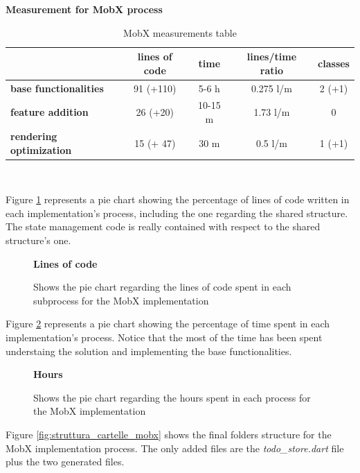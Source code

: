 \begin{table}[H]
    \caption*{\textbf{Measurement for MobX process}}
    \centering 
       \begin{tabular}{| l | c | c | c | c |}
    \hline
    \rowcolor{bluepoli!40} %
    \hline
     & \textbf{lines of code} & \textbf{time} & \textbf{lines/time ratio} & \textbf{classes} \T\B \\
     \hline
    \textbf{base functionalities} & 91 (+110) & 5-6 h & 0.275 l/m & 2 (+1) \T\B \\ 
    \textbf{feature addition} & 26 (+20) & 10-15 m & 1.73 l/m & 0 \T\B\\ 
    \textbf{rendering optimization} & 15 (+ 47) & 30 m & 0.5 l/m & 1 (+1) \B\\
    \hline
    \end{tabular}
    \\[10pt]
    \caption{MobX measurements table}
    \label{table:recap_mobx}
\end{table}

Figure \ref{image:mobx_lines_piechart} represents a pie chart showing the percentage of lines of code written in each implementation's process, including the one regarding the shared structure. The state management code is really contained with respect to the shared structure's one.

\begin{figure}[H]
\caption*{\textbf{Lines of code}}
\centering
{}
 \caption{Shows the pie chart regarding the lines of code spent in each subprocess for the MobX implementation}
 \label{image:mobx_lines_piechart}
\end{figure}
Figure \ref{image:mobx_hours_piechart} represents a pie chart showing the percentage of time spent in each implementation's process. Notice that the most of the time has been spent understaing the solution and implementing the base functionalities.

\begin{figure}[H]
 \caption*{\textbf{Hours}}
\centering
{}
\caption{Shows the pie chart regarding the hours spent in each process for the MobX implementation}
 \label{image:mobx_hours_piechart}
\end{figure}
Figure \ref{fig:struttura_cartelle_mobx} shows the final folders structure for the MobX implementation process. The only added files are the \textit{todo\_store.dart} file plus the two generated files.


